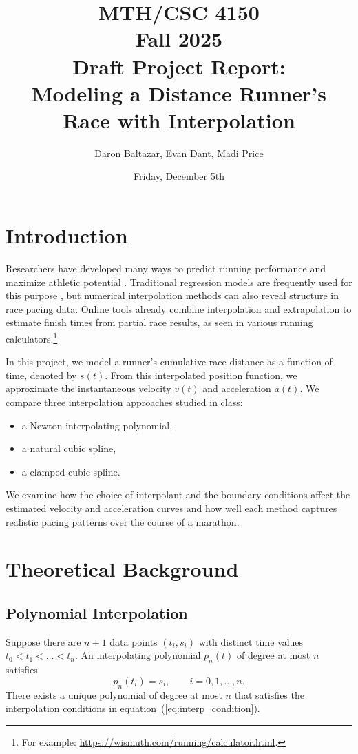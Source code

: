 \documentclass[12pt]{article}
\title{MTH/CSC 4150 \\ Fall 2025 \\ Draft Project Report:\\
Modeling a Distance Runner's Race with Interpolation}
\author{Daron Baltazar, Evan Dant, Madi Price}
\date{Friday, December 5th}
\begin{document}
\maketitle

\section{Introduction}

Researchers have developed many ways to predict running performance and maximize
athletic potential \cite{Dash}. Traditional regression models are frequently used
for this purpose \cite{MillettMelanson}, but numerical interpolation methods can
also reveal structure in race pacing data. Online tools already combine interpolation
and extrapolation to estimate finish times from partial race results, as seen in
various running calculators.\footnote{For example:
\url{https://wismuth.com/running/calculator.html}.}

In this project, we model a runner's cumulative race distance as a function of
time, denoted by $s(t)$. From this interpolated position function, we approximate
the instantaneous velocity $v(t)$ and acceleration $a(t)$. We compare three
interpolation approaches studied in class:
\begin{itemize}
  \item a Newton interpolating polynomial,
  \item a natural cubic spline,
  \item a clamped cubic spline.
\end{itemize}
We examine how the choice of interpolant and the boundary conditions affect the
estimated velocity and acceleration curves and how well each method captures
realistic pacing patterns over the course of a marathon.

\section{Theoretical Background}

\subsection{Polynomial Interpolation}

Suppose there are $n+1$ data points $(t_i, s_i)$ with distinct time values
$t_0 < t_1 < \dots < t_n$. An interpolating polynomial $p_n(t)$ of degree at most $n$
satisfies
\begin{equation}
  p_n(t_i) = s_i, \qquad i = 0,1,\dots,n.
  \label{eq:interp_condition}
\end{equation}
There exists a unique polynomial of degree at most $n$ that satisfies
the interpolation conditions in equation~(\ref{eq:interp_condition}).
\end{document}
